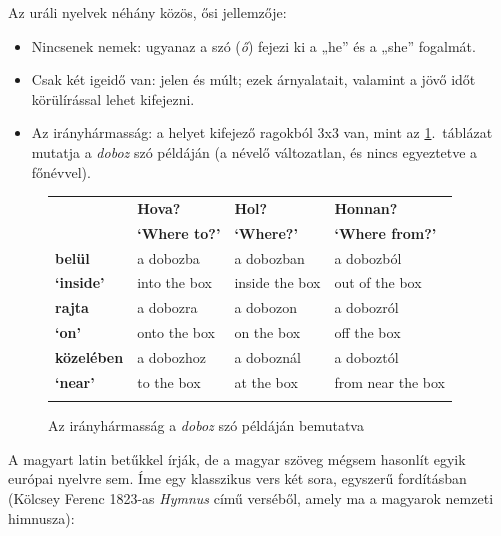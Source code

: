 \begin{multicols}{2}

  Az uráli nyelvek néhány közös, ősi jel\-lem\-ző\-je:

  \begin{itemize}
  \item Nincsenek nemek: ugyanaz a szó (\textit{ő}) fejezi ki a „he” és a „she” fogalmát.
  \item Csak két igeidő van: jelen és múlt; ezek árnyalatait, valamint a jövő időt körülírással lehet kifejezni.
  \item Az irányhármasság: a helyet kifejező ragokból 3x3 van, mint az \ref{doboz}.~táblázat mutatja a \textit{doboz} szó példáján (a névelő változatlan, és nincs egyeztetve a főnévvel).
  \end{itemize}

  \begin{figure}[htb]
    \setlength{\tabcolsep}{2em}
    \begin{tabularx}{\textwidth}{llll} \toprule\addlinespace
      \textbf{} & \textbf{Hova?} & \textbf{Hol?} & \textbf{Honnan?}\\
      \textbf{} & \textbf{`Where to?'} & \textbf{`Where?'} & \textbf{`Where from?'}\\
       \addlinespace\midrule\addlinespace
      \textbf{belül} & a dobozba & a dobozban & a dobozból\\
      \textbf{`inside'} & into the box & inside the box & out of the box\\
      \addlinespace\midrule\addlinespace
      \textbf{rajta} & a dobozra & a dobozon & a dobozról\\
      \textbf{`on'} & onto the box & on the box & off the box\\ 
      \addlinespace\midrule\addlinespace
      \textbf{közelében} & a dobozhoz & a doboznál & a doboztól\\
      \textbf{`near'} & to the box & at the box & from near the box\\ \addlinespace\bottomrule
    \end{tabularx}
    \caption{Az irányhármasság a \textit{doboz} szó példáján bemutatva}
    \label{doboz}
  \end{figure}

  A magyart latin betűkkel írják, de a ma\-gyar szöveg mégsem hasonlít egyik európai nyelvre sem. Íme egy klasszikus vers két sora, egyszerű fordításban (Kölcsey Ferenc 1823-as \textit{Hymnus} című verséből, amely ma a magyarok nemzeti himnusza):


\end{multicols}
